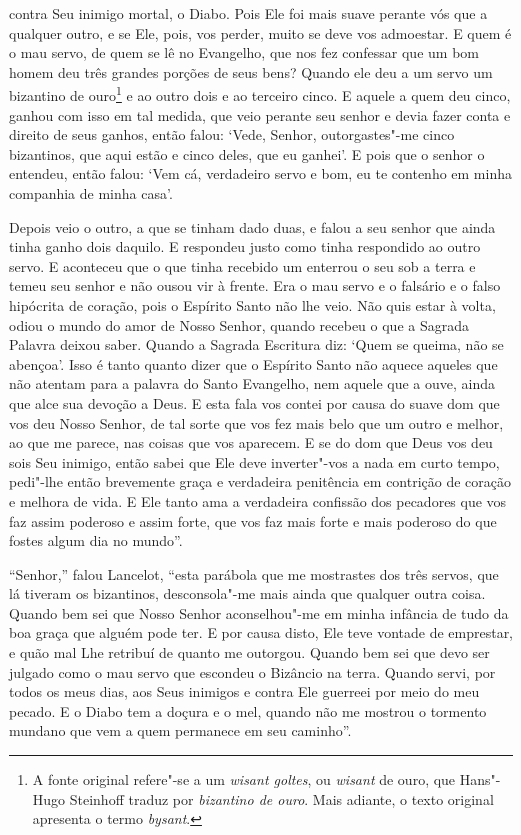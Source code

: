 contra Seu inimigo mortal, o Diabo. Pois Ele foi mais suave perante vós que a
qualquer outro, e se Ele, pois, vos perder, muito se deve vos admoestar. E quem
é o mau servo, de quem se lê no Evangelho, que nos fez confessar que um bom
homem deu três grandes porções de seus bens? Quando ele deu a um servo um
bizantino de ouro\footnote{ A fonte original refere"-se a um \textit{wisant
goltes}, ou \textit{wisant} de ouro, que Hans"-Hugo Steinhoff traduz por
\textit{bizantino de ouro}. Mais adiante, o texto original apresenta o termo
\textit{bysant}.} e ao outro dois e ao terceiro cinco. E aquele a
quem deu cinco, ganhou com isso em tal medida, que veio perante seu senhor e
devia fazer conta e direito de seus ganhos, então falou: ‘Vede, Senhor,
outorgastes"-me cinco bizantinos, que aqui estão e cinco deles, que eu ganhei’.
E pois que o senhor o entendeu, então falou: ‘Vem cá, verdadeiro servo e bom,
eu te contenho em minha companhia de minha casa’. 

Depois veio o outro, a que se tinham dado duas, e falou a seu senhor que ainda
tinha ganho dois daquilo. E respondeu justo como tinha respondido ao outro
servo. E aconteceu que o que tinha recebido um enterrou o seu sob a terra e
temeu seu senhor e não ousou vir à frente. Era o mau servo e o falsário e o
falso hipócrita de coração, pois o Espírito Santo não lhe veio. Não quis estar
à volta, odiou o mundo do amor de Nosso Senhor, quando recebeu o que a Sagrada
Palavra deixou saber. Quando a Sagrada Escritura diz: ‘Quem se queima, não se
abençoa’. Isso é tanto quanto dizer que o Espírito Santo não aquece aqueles que
não atentam para a palavra do Santo Evangelho, nem aquele que a ouve, ainda que
alce sua devoção a Deus. E esta fala vos contei por causa do suave dom que vos
deu Nosso Senhor, de tal sorte que vos fez mais belo que um outro e melhor, ao
que me parece, nas coisas que vos aparecem. E se do dom que Deus vos deu sois
Seu inimigo, então sabei que Ele deve inverter"-vos a nada em curto tempo,
pedi"-lhe então brevemente graça e verdadeira penitência em contrição de coração
e melhora de vida. E Ele tanto ama a verdadeira confissão dos pecadores que
vos faz assim poderoso e assim forte, que vos faz mais forte e mais
poderoso do que fostes algum dia no mundo”.  

“Senhor,” falou Lancelot, “esta parábola que me mostrastes dos três servos, que
lá tiveram os bizantinos, desconsola"-me mais ainda que qualquer outra coisa.
Quando bem sei que Nosso Senhor aconselhou"-me em minha infância de tudo da boa
graça que alguém pode ter. E por causa disto, Ele teve vontade de emprestar, e
quão mal Lhe retribuí de quanto me outorgou. Quando bem sei que devo ser
julgado como o mau servo que escondeu o Bizâncio na terra. Quando servi, por
todos os meus dias, aos Seus inimigos e contra Ele guerreei por meio do meu
pecado. E o Diabo tem a doçura e o mel, quando não me mostrou o tormento
mundano que vem a quem permanece em seu caminho”. 


